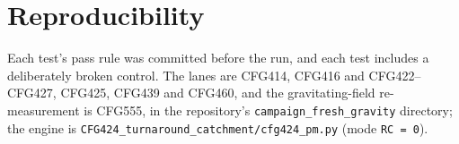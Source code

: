 \documentclass[10pt]{article}
\begin{document}
\section{Reproducibility}
Each test's pass rule was committed before the run, and each test includes a deliberately broken control. The lanes are CFG414, CFG416 and CFG422--CFG427, CFG425, CFG439 and CFG460, and the gravitating-field re-measurement is CFG555, in the repository's \texttt{campaign\_fresh\_gravity} directory; the engine is \texttt{CFG424\_turnaround\_catchment/cfg424\_pm.py} (mode \texttt{RC = 0}).
\end{document}
